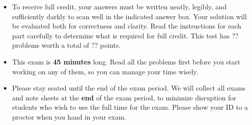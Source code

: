\documentclass[12pt, oneside]{article}
\begin{document}
\begin{center}
\begin{minipage}[t]{7in}
\begin{itemize}
  \item  To receive full credit, your answers must
  be written neatly, legibly, and sufficiently darkly to scan well in the indicated answer box. Your solution will be evaluated both for correctness and clarity.
  Read the instructions for each part carefully to determine what is required for full credit.
  This test has $??$ problems worth a total of $??$ points.
  
  \item This exam is {\bf 45 minutes} long. Read all the problems first before you start 
  working on any of them, so you can manage your time wisely.
  
  \item Please stay seated until the end of the exam period.
  We will collect all exams and note sheets at the {\bf end} of the exam period, to minimize disruption 
  for students who wish to use the full time for the exam. Please show your ID to a proctor when you hand 
  in your exam. 
  
  
  \end{itemize}
  \end{minipage} \hfill
  \end{center}
  \newpage
\fi
\end{document}
